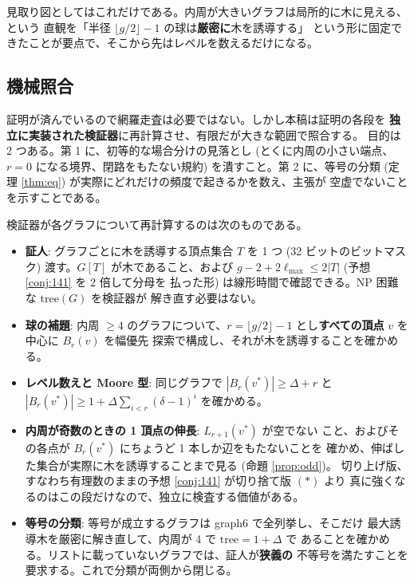 \documentclass[paper=a4,fontsize=10.5pt,jafontsize=10.5pt]{jlreq}
\theoremstyle{plain}
\theoremstyle{definition}
\begin{document}
見取り図としてはこれだけである。内周が大きいグラフは局所的に木に見える、という
直観を「半径 $\lfloor g/2 \rfloor - 1$ の球は\textbf{厳密に}木を誘導する」
という形に固定できたことが要点で、そこから先はレベルを数えるだけになる。

\subsection*{機械照合}

証明が済んでいるので網羅走査は必要ではない。しかし本稿は証明の各段を
\textbf{独立に実装された検証器}に再計算させ、有限だが大きな範囲で照合する。
目的は 2 つある。第 1 に、初等的な場合分けの見落とし (とくに内周の小さい端点、
$r = 0$ になる境界、閉路をもたない規約) を潰すこと。第 2 に、等号の分類
(定理 \ref{thm:eq}) が実際にどれだけの頻度で起きるかを数え、主張が
空虚でないことを示すことである。

検証器が各グラフについて再計算するのは次のものである。

\begin{itemize}
\item \textbf{証人}: グラフごとに木を誘導する頂点集合 $T$ を 1 つ
  (32 ビットのビットマスク) 渡す。$G[T]$ が木であること、および
  $g - 2 + 2\ell_{\max} \le 2|T|$ (予想 \ref{conj:141} を 2 倍して分母を
  払った形) は線形時間で確認できる。NP 困難な $\mathrm{tree}(G)$ を検証器が
  解き直す必要はない。
\item \textbf{球の補題}: 内周 $\ge 4$ のグラフについて、$r = \lfloor g/2
  \rfloor - 1$ とし\textbf{すべての頂点} $v$ を中心に $B_r(v)$ を幅優先
  探索で構成し、それが木を誘導することを確かめる。
\item \textbf{レベル数えと Moore 型}: 同じグラフで
  $|B_r(v^*)| \ge \Delta + r$ と
  $|B_r(v^*)| \ge 1 + \Delta \sum_{i<r} (\delta-1)^i$ を確かめる。
\item \textbf{内周が奇数のときの 1 頂点の伸長}: $L_{r+1}(v^*)$ が空でない
  こと、およびその各点が $B_r(v^*)$ にちょうど 1 本しか辺をもたないことを
  確かめ、伸ばした集合が実際に木を誘導することまで見る (命題 \ref{prop:odd})。
  切り上げ版、すなわち有理数のままの予想 \ref{conj:141} が切り捨て版 $(\ast)$ より
  真に強くなるのはこの段だけなので、独立に検査する価値がある。
\item \textbf{等号の分類}: 等号が成立するグラフは graph6 で全列挙し、そこだけ
  最大誘導木を厳密に解き直して、内周が 4 で $\mathrm{tree} = 1 + \Delta$ で
  あることを確かめる。リストに載っていないグラフでは、証人が\textbf{狭義の}
  不等号を満たすことを要求する。これで分類が両側から閉じる。
\end{itemize}
\end{document}
